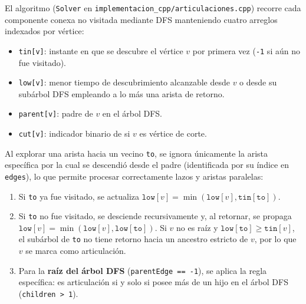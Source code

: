 \documentclass[11pt,a4paper]{article}
\begin{document}
El algoritmo (\texttt{Solver} en \texttt{implementacion\_cpp/articulaciones.cpp})
recorre cada componente conexa no visitada mediante DFS manteniendo cuatro
arreglos indexados por vértice:
\begin{itemize}
  \item \texttt{tin[v]}: instante en que se descubre el vértice $v$ por primera
    vez (\texttt{-1} si aún no fue visitado).
  \item \texttt{low[v]}: menor tiempo de descubrimiento alcanzable desde $v$ o
    desde su subárbol DFS empleando a lo más una arista de retorno.
  \item \texttt{parent[v]}: padre de $v$ en el árbol DFS.
  \item \texttt{cut[v]}: indicador binario de si $v$ es vértice de corte.
\end{itemize}

Al explorar una arista hacia un vecino \texttt{to}, se ignora únicamente la
arista específica por la cual se descendió desde el padre (identificada por su
índice en \texttt{edges}), lo que permite procesar correctamente lazos y
aristas paralelas:
\begin{enumerate}
  \item Si \texttt{to} ya fue visitado, se actualiza
    $\texttt{low}[v] = \min(\texttt{low}[v], \texttt{tin}[\texttt{to}])$.
  \item Si \texttt{to} no fue visitado, se desciende recursivamente y, al
    retornar, se propaga
    $\texttt{low}[v] = \min(\texttt{low}[v], \texttt{low}[\texttt{to}])$.
    Si $v$ no es raíz y $\texttt{low}[\texttt{to}] \ge \texttt{tin}[v]$, el
    subárbol de \texttt{to} no tiene retorno hacia un ancestro estricto de $v$,
    por lo que $v$ se marca como articulación.
  \item Para la \textbf{raíz del árbol DFS} (\texttt{parentEdge == -1}), se
    aplica la regla específica: es articulación si y solo si posee más de un
    hijo en el árbol DFS (\texttt{children > 1}).
\end{enumerate}
\end{document}
